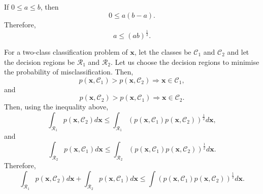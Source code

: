 \subsection{}
If $0 \leq a \leq b$, then
%
\begin{equation}
0 \leq a (b - a).
\end{equation}
%
Therefore,
%
\begin{equation}
a \leq (ab) ^ \frac{1}{2}.
\end{equation}
%

For a two-class classification problem of $\mathbf{x}$, let the classes be $\mathcal{C}_1$ and $\mathcal{C}_2$ and let the decision regions be $\mathcal{R}_1$ and $\mathcal{R}_2$.
Let us choose the decision regions to minimise the probability of misclassification.
Then,
%
\begin{equation}
p(\mathbf{x}, \mathcal{C}_1) > p(\mathbf{x}, \mathcal{C}_2) \Rightarrow \mathbf{x} \in \mathcal{C}_1, 
\end{equation}
%
and
%
\begin{equation}
p(\mathbf{x}, \mathcal{C}_2) > p(\mathbf{x}, \mathcal{C}_1) \Rightarrow \mathbf{x} \in \mathcal{C}_2.
\end{equation}
%
Then, using the inequality above,
%
\begin{equation}
\int_{\mathcal{R}_1} p(\mathbf{x}, \mathcal{C}_2) d\mathbf{x} \leq \int_{\mathcal{R}_1} \left( p(\mathbf{x}, \mathcal{C}_1) p(\mathbf{x}, \mathcal{C}_2) \right) ^ \frac{1}{2} d\mathbf{x},
\end{equation}
%
and
%
\begin{equation}
\int_{\mathcal{R}_2} p(\mathbf{x}, \mathcal{C}_1) d\mathbf{x} \leq \int_{\mathcal{R}_2} \left( p(\mathbf{x}, \mathcal{C}_1) p(\mathbf{x}, \mathcal{C}_2) \right) ^ \frac{1}{2} d\mathbf{x}.
\end{equation}
%
Therefore,
%
\begin{equation}
\int_{\mathcal{R}_1} p(\mathbf{x}, \mathcal{C}_2) d\mathbf{x} + \int_{\mathcal{R}_2} p(\mathbf{x}, \mathcal{C}_1) d\mathbf{x} \leq \int \left( p(\mathbf{x}, \mathcal{C}_1) p(\mathbf{x}, \mathcal{C}_2) \right) ^ \frac{1}{2} d\mathbf{x}.
\end{equation}
%


